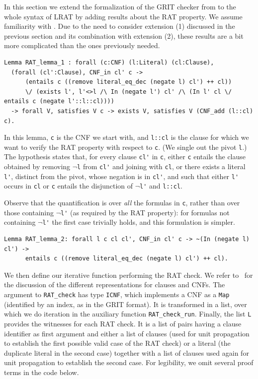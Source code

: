 \documentclass{article}
\begin{document}
In this section we extend the formalization of the GRIT checker from \cite{grit} to the whole syntax of LRAT by adding results about the RAT property. We assume familiarity with \cite{grit}.
Due to the need to consider extension (1) discussed in the previous section and its combination with extension (2), these results are a bit more
complicated than the ones previously needed.

\begin{lstlisting}
Lemma RAT_lemma_1 : forall (c:CNF) (l:Literal) (cl:Clause),
  (forall (cl':Clause), CNF_in cl' c -> 
      (entails c ((remove literal_eq_dec (negate l) cl') ++ cl))
      \/ (exists l', l'<>l /\ In (negate l') cl' /\ (In l' cl \/ entails c (negate l'::l::cl))))
  -> forall V, satisfies V c -> exists V, satisfies V (CNF_add (l::cl) c).
\end{lstlisting}

In this lemma, \lstinline+c+ is the CNF we start with, and \lstinline+l::cl+ is the clause for which we want to verify
the RAT property with respect to \lstinline+c+.
(We single out the pivot \lstinline+l+.)
The hypothesis states that, for every clause \lstinline+cl'+ in \lstinline+c+, either \lstinline+c+ entails the clause
obtained by removing $\neg$\lstinline+l+ from \lstinline+cl'+ and joining with \lstinline+cl+, or there exists a
literal \lstinline+l'+, distinct from the pivot, whose negation is in \lstinline+cl'+, and such that either \lstinline+l'+
occurs in \lstinline+cl+ or \lstinline+c+ entails the disjunction of $\neg$\lstinline+l'+ and \lstinline+l::cl+.

Observe that the quantification is over \emph{all} the formulas in \lstinline+c+, rather than over those containing
$\neg$\lstinline+l'+ (as required by the RAT property): for formulas not containing $\neg$\lstinline+l'+ the first case
trivially holds, and this formulation is simpler.

\begin{lstlisting}
Lemma RAT_lemma_2: forall l c cl cl', CNF_in cl' c -> ~(In (negate l) cl') ->
      entails c ((remove literal_eq_dec (negate l) cl') ++ cl).
\end{lstlisting}

We then define our iterative function performing the RAT check.
We refer to~\cite{grit} for the discussion of the different representations for clauses and CNFs.
The argument to \lstinline+RAT_check+ has type \lstinline+ICNF+, which implements a CNF as a \lstinline+Map+ (identified
by an index, as in the GRIT format).
It is transformed in a list, over which we do iteration in the auxiliary function \lstinline+RAT_check_run+.
Finally, the list \lstinline+L+ provides the witnesses for each RAT check.
It is a list of pairs having a clause identifier as first argument and either a list of clauses (used for unit
propagation to establish the first possible valid case of the RAT check) or a literal (the duplicate literal in the
second case) together with a list of clauses used again for unit propagation to establish the second case.
For legibility, we omit several proof terms in the code below.
\end{document}
